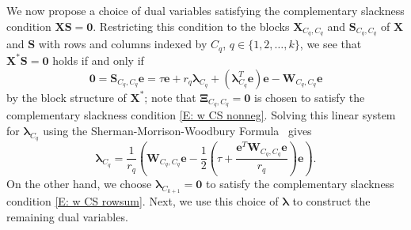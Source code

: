 \documentclass[twoside,11pt]{article}
\renewcommand{\S}{\mathbf{S}}
\newcommand{\E}{\mathbf{E}}
\newcommand{\e}{\bs {e}}
\newcommand{\bs}{\boldsymbol}
\newcommand{\X}{\bs {X}}
\newcommand{\W}{\bs {W}}
\newcommand{\0}{\bs{0}}
\newcommand{\sbra}[1] {\ensuremath{ \left[ #1\right]}} %
\newcommand{\rbra}[1]{\ensuremath{\left( #1 \right)}} %
\begin{document}
{%
We now propose a choice of dual variables satisfying the complementary slackness condition \(\X\S = \bs 0\).
Restricting this condition to the blocks \(\X_{C_q, C_q}\) and \(\S_{C_q, C_q}\) of \(\X\) and \(\S\) with
rows and columns indexed by \(C_q\), \(q \in\{1,2,\dots, k\}\), we see that \(\X^*\S=\bs 0\) holds if and only if
\[
\bs 0 = \S_{C_q, C_q} \e = %
\tau \e  + r_q \bs\lambda_{C_q} + (\bs\lambda_{C_q}^T \e) \e - \W_{C_q, C_q} \e
\]
by the block structure of \(\X^*\);
note that \(\bs\Xi_{C_q, C_q} = \bs 0\) is chosen to satisfy the complementary slackness condition \eqref{E: w CS nonneg}.
Solving this linear system for \(\bs\lambda_{C_q}\)
using the Sherman-Morrison-Woodbury
Formula~\cite[Equation (2.1.4)]{golub2013matrix} gives
\begin{equation} \label{eq: lam q}
\bs \lambda_{C_q} = \frac{1}{r_q} \left( \W_{C_q, C_q} \e - \frac{1}{2}
\left(\tau + \frac{ \e^T \W_{C_q, C_q} \e}{r_q} \right)   \e \right).
\end{equation}
On the other hand, we choose \(\bs\lambda_{C_{k+1}} = \0\)
to satisfy the complementary slackness condition
\eqref{E: w CS rowsum}. %
Next, we use this choice of \(\bs \lambda\) to construct the remaining dual variables.

}
\end{document}
